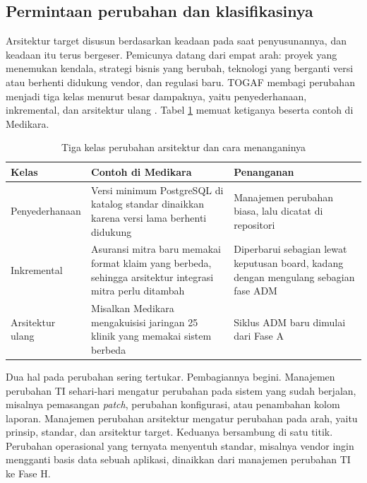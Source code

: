 \subsection*{Permintaan perubahan dan klasifikasinya}

Arsitektur target disusun berdasarkan keadaan pada saat penyusunannya, dan
keadaan itu terus bergeser. Pemicunya datang dari empat arah: proyek yang
menemukan kendala, strategi bisnis yang berubah, teknologi yang berganti
versi atau berhenti didukung vendor, dan regulasi baru. TOGAF membagi
perubahan menjadi tiga kelas menurut besar dampaknya, yaitu penyederhanaan,
inkremental, dan arsitektur ulang \cite{togaf10}. Tabel
\ref{tab:ch14-perubahan} memuat ketiganya beserta contoh di Medikara.

\begin{table}[!htb]
  \centering
  \caption{Tiga kelas perubahan arsitektur dan cara menanganinya}
  \label{tab:ch14-perubahan}
  \begin{tabularx}{\textwidth}{>{\raggedright\arraybackslash}p{2.9cm}>{\raggedright\arraybackslash}X>{\raggedright\arraybackslash}X}
    \hline
    \textbf{Kelas} & \textbf{Contoh di Medikara} & \textbf{Penanganan} \\
    \hline
    Penyederhanaan & Versi minimum PostgreSQL di katalog standar dinaikkan
      karena versi lama berhenti didukung & Manajemen perubahan biasa, lalu
      dicatat di repositori \\
    \hline
    Inkremental & Asuransi mitra baru memakai format klaim yang berbeda,
      sehingga arsitektur integrasi mitra perlu ditambah & Diperbarui
      sebagian lewat keputusan board, kadang dengan mengulang sebagian fase
      ADM \\
    \hline
    Arsitektur ulang & Misalkan Medikara mengakuisisi jaringan 25 klinik
      yang memakai sistem berbeda & Siklus ADM baru dimulai dari Fase A \\
    \hline
  \end{tabularx}
\end{table}

Dua hal pada perubahan sering tertukar. Pembagiannya begini. Manajemen
perubahan TI sehari-hari mengatur perubahan pada sistem yang sudah berjalan,
misalnya pemasangan \textit{patch}, perubahan konfigurasi, atau penambahan
kolom laporan. Manajemen perubahan arsitektur mengatur perubahan pada arah,
yaitu prinsip, standar, dan arsitektur target. Keduanya bersambung di satu
titik. Perubahan operasional yang ternyata menyentuh standar, misalnya
vendor ingin mengganti basis data sebuah aplikasi, dinaikkan dari manajemen
perubahan TI ke Fase H.

